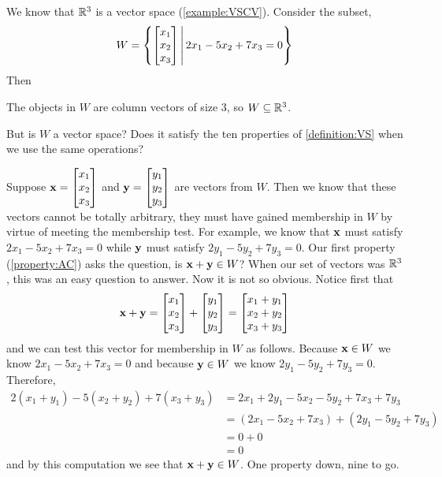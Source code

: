 \documentclass{ximera}
\begin{document}
\begin{example}
  We know that $\mathbb{R}^{3}$ is a vector space (\ref{example:VSCV}).
  Consider the subset,
  \[
    W=\left\lbrace\begin{bmatrix}x_1\\x_2\\x_3\end{bmatrix}\,\middle|\,2x_1-5x_2+7x_3=0\right\rbrace
  \]
  Then
  \begin{multipleChoice}
  \end{multipleChoice}

  \begin{feedback}[correct]
    The objects in $W$ are column vectors of size 3, so
    $W\subseteq\mathbb{R}^{3}$.
  \end{feedback}

  \begin{question}
    But is $W$ a vector space?  Does it satisfy the ten properties of
    \ref{definition:VS} when we use the same operations?

    \begin{multipleChoice}
    \end{multipleChoice}

    Suppose $\mathbf{x}=\begin{bmatrix}x_1\\x_2\\x_3\end{bmatrix}$ and
    $\mathbf{y}=\begin{bmatrix}y_1\\y_2\\y_3\end{bmatrix}$ are vectors from $W$.  Then
    we know that these vectors cannot be totally arbitrary, they must
    have gained membership in $W$ by virtue of meeting the membership
    test.  For example, we know that $\mathbf{x}$ must satisfy
    $2x_1-5x_2+7x_3=0$ while $\mathbf{y}$ must satisfy
    $2y_1-5y_2+7y_3=0$.  Our first property (\ref{property:AC}) asks
    the question, is $\mathbf{x}+\mathbf{y}\in W$?  When our set of
    vectors was $\mathbb{R}^{3}$, this was an easy question to answer.  Now
    it is not so obvious.  Notice first that
    \[
      \mathbf{x}+\mathbf{y}=\begin{bmatrix}x_1\\x_2\\x_3\end{bmatrix}+\begin{bmatrix}y_1\\y_2\\y_3\end{bmatrix}=
      \begin{bmatrix}x_1+y_1\\x_2+y_2\\x_3+y_3\end{bmatrix}
    \]
    and we can test this vector for membership in $W$ as follows.
    Because $\mathbf{x}\in W$ we know $2x_1-5x_2+7x_3=0$ and because
    $\mathbf{y}\in W$ we know $2y_1-5y_2+7y_3=0$.  Therefore,
    \begin{align*}
      2(x_1+y_1)-5(x_2+y_2)+7(x_3+y_3)
      &=2x_1+2y_1-5x_2-5y_2+7x_3+7y_3\\
      &=(2x_1-5x_2+7x_3)+(2y_1-5y_2+7y_3)\\
      &=0 + 0\\
      &=0
    \end{align*}
    and by this computation we see that $\mathbf{x}+\mathbf{y}\in W$.  One
    property down, nine to go.
    

\end{question}
\end{example}
\end{document}
